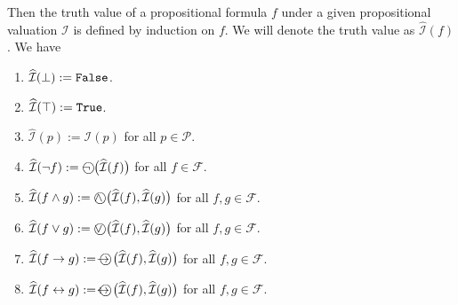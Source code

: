 \begin{table}[!ht]
  \centering
{}
  \caption{Interpretation of the propositional operators.}
  \label{tab:aussagen-logik}
\end{table}
Then the truth value of a propositional formula $f$ under a given propositional valuation $\mathcal{I}$ is
defined by induction on $f$.  We will denote the truth value as
$\widehat{\mathcal{I}}(f)$ .  We have
\begin{enumerate}
\item $\widehat{\mathcal{I}}(\bot) := \texttt{False}$.
\item $\widehat{\mathcal{I}}(\top) := \texttt{True}$.
\item $\widehat{\mathcal{I}}(p) := \mathcal{I}(p)$ for all $p \in \mathcal{P}$.
\item $\widehat{\mathcal{I}}(\neg f) := \circneg\;\bigl(\widehat{\mathcal{I}}(f)\bigr)$ for all $f \in \mathcal{F}$.
\item $\widehat{\mathcal{I}}(f \wedge g) := \circwedge\;\bigl(\widehat{\mathcal{I}}(f), \widehat{\mathcal{I}}(g)\bigr)$ 
      for all $f, g \in \mathcal{F}$.
\item $\widehat{\mathcal{I}}(f \vee g) := \circvee\;\bigl(\widehat{\mathcal{I}}(f), \widehat{\mathcal{I}}(g)\bigr)$ 
      for all $f, g \in \mathcal{F}$.
\item $\widehat{\mathcal{I}}(f \rightarrow g) := \circright\;\bigl(\widehat{\mathcal{I}}(f), \widehat{\mathcal{I}}(g)\bigr)$ 
      for all $f, g \in \mathcal{F}$.
\item $\widehat{\mathcal{I}}(f \leftrightarrow g) := \circleftright\;\bigl(\widehat{\mathcal{I}}(f), \widehat{\mathcal{I}}(g)\bigr)$ 
      for all $f, g \in \mathcal{F}$.
\end{enumerate}
